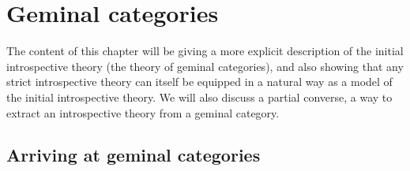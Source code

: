 \filestart

\section{Geminal categories}\label{GeminalChapter}
The content of this chapter will be giving a more explicit description of the initial introspective theory (the theory of geminal categories), and also showing that any strict introspective theory can itself be equipped in a natural way as a model of the initial introspective theory. We will also discuss a partial converse, a way to extract an introspective theory from a geminal category.

\subsection{Arriving at geminal categories}
